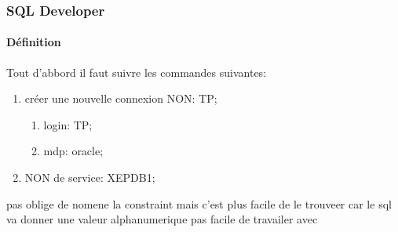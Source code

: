 \documentclass{article}
\begin{document}
\subsubsection{SQL Developer}
\paragraph{Définition}Tout d'abbord il faut suivre les commandes suivantes:
\begin{enumerate}
    \item créer une nouvelle connexion NON: TP;
    \begin{enumerate}[noitemsep]
        \item login: TP;
        \item mdp: oracle;
    \end{enumerate}
    \item NON de service: XEPDB1;
\end{enumerate}
pas oblige de nomene la constraint mais c'est plus facile de le trouveer car le sql va donner une valeur alphanumerique pas facile de travailer avec
\end{document}
